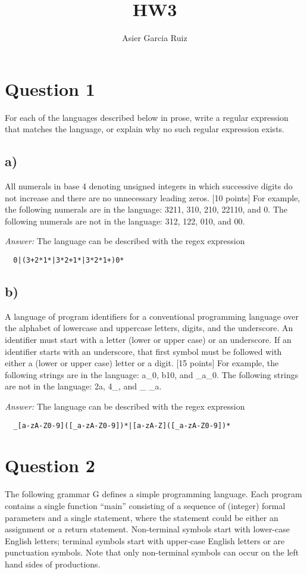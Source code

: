 \documentclass{article}
\title{HW3}
\author{Asier Garcia Ruiz}
\begin{document}
\maketitle

\section*{Question 1}
For each of the languages described below in prose, write a regular expression
that matches the language, or explain why no such regular expression exists.

\subsection*{a)}
All numerals in base 4 denoting unsigned integers in which successive digits do not
increase and there are no unnecessary leading zeros. [10 points]
For example, the following numerals are in the language: 3211, 310, 210,
22110, and 0. The following numerals are not in the language: 312, 122, 010, and 00.

\textit{Answer:}
The language can be described with the regex expression
\begin{verbatim}
  0|(3+2*1*|3*2+1*|3*2*1+)0*
\end{verbatim}

\subsection*{b)}
A language of program identifiers for a conventional programming language over
the alphabet of lowercase and uppercase letters, digits, and the underscore.
An identifier must start with a letter (lower or upper case) or an underscore.
If an identifier starts with an underscore, that first symbol must be followed
with either a (lower or upper case) letter or a digit. [15 points]
For example, the following strings are in the language: a\_0, b10, and \_a\_0.
The following strings are not in the language: 2a, 4\_, and \_ \_a.

\textit{Answer:}
The language can be described with the regex expression
\begin{verbatim}
  _[a-zA-Z0-9]([_a-zA-Z0-9])*|[a-zA-Z]([_a-zA-Z0-9])*
\end{verbatim}

\section*{Question 2}
The following grammar G defines a simple programming language. Each program contains
a single function “main” consisting of a sequence of (integer) formal parameters
and a single statement, where the statement could be either an assignment or a return
statement. Non-terminal symbols start with lower-case English letters; terminal
symbols start with upper-case English letters or are punctuation symbols. Note
that only non-terminal symbols can occur on the left hand sides of productions.
\end{document}
